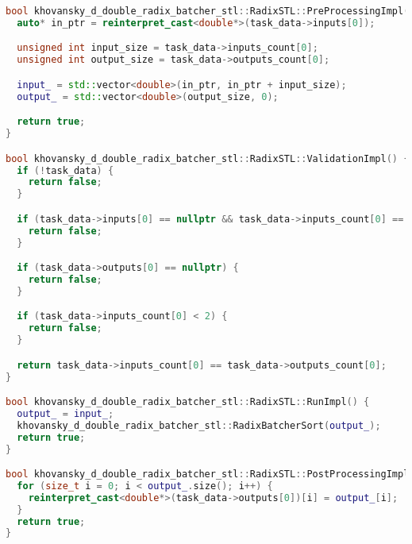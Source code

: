\documentclass[12pt]{article}
\begin{document}
\begin{lstlisting}[language=C++,
    breaklines=true,       % Автоматический перенос строк
    columns=fullflexible ]
bool khovansky_d_double_radix_batcher_stl::RadixSTL::PreProcessingImpl() {
  auto* in_ptr = reinterpret_cast<double*>(task_data->inputs[0]);

  unsigned int input_size = task_data->inputs_count[0];
  unsigned int output_size = task_data->outputs_count[0];

  input_ = std::vector<double>(in_ptr, in_ptr + input_size);
  output_ = std::vector<double>(output_size, 0);

  return true;
}

bool khovansky_d_double_radix_batcher_stl::RadixSTL::ValidationImpl() {
  if (!task_data) {
    return false;
  }

  if (task_data->inputs[0] == nullptr && task_data->inputs_count[0] == 0) {
    return false;
  }

  if (task_data->outputs[0] == nullptr) {
    return false;
  }

  if (task_data->inputs_count[0] < 2) {
    return false;
  }

  return task_data->inputs_count[0] == task_data->outputs_count[0];
}

bool khovansky_d_double_radix_batcher_stl::RadixSTL::RunImpl() {
  output_ = input_;
  khovansky_d_double_radix_batcher_stl::RadixBatcherSort(output_);
  return true;
}

bool khovansky_d_double_radix_batcher_stl::RadixSTL::PostProcessingImpl() {
  for (size_t i = 0; i < output_.size(); i++) {
    reinterpret_cast<double*>(task_data->outputs[0])[i] = output_[i];
  }
  return true;
}
\end{lstlisting}
\end{document}
